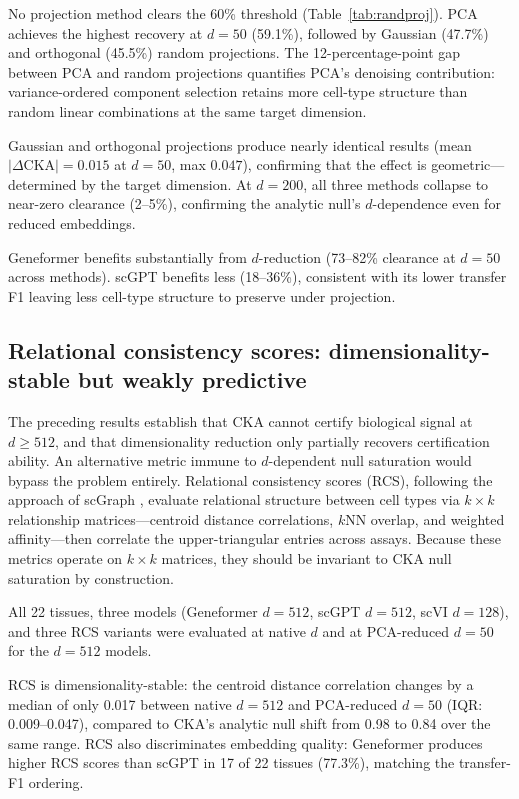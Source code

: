 \documentclass[11pt]{article}
\begin{document}
No projection method clears the 60\% threshold
(Table~\ref{tab:randproj}). PCA achieves the highest recovery at
$d = 50$ (59.1\%), followed by Gaussian (47.7\%) and orthogonal
(45.5\%) random projections. The 12-percentage-point gap between PCA
and random projections quantifies PCA's denoising contribution:
variance-ordered component selection retains more cell-type structure
than random linear combinations at the same target dimension.

Gaussian and orthogonal projections produce nearly identical results
(mean $|\Delta\text{CKA}| = 0.015$ at $d = 50$, max $0.047$),
confirming that the effect is geometric---determined by the target
dimension. At $d = 200$, all three methods collapse to near-zero
clearance (2--5\%), confirming the analytic null's $d$-dependence even for
reduced embeddings.

Geneformer benefits substantially from $d$-reduction (73--82\% clearance
at $d = 50$ across methods). scGPT benefits less (18--36\%), consistent
with its lower transfer F1 leaving less cell-type structure to preserve
under projection.


\subsection{Relational consistency scores: dimensionality-stable but weakly predictive}
\label{sec:scgraph}

The preceding results establish that CKA cannot certify biological
signal at $d \geq 512$, and that dimensionality reduction only
partially recovers certification ability. An alternative metric immune
to $d$-dependent null saturation would bypass the problem entirely.
Relational consistency scores (RCS), following the approach of scGraph
\citep{wang2026scgraph}, evaluate relational structure between cell
types via $k \times k$ relationship matrices---centroid distance
correlations, $k$NN overlap, and weighted affinity---then correlate the
upper-triangular entries across assays. Because these metrics operate on
$k \times k$ matrices, they should be invariant to CKA null saturation
by construction.

All 22 tissues, three models (Geneformer $d = 512$, scGPT $d = 512$,
scVI $d = 128$), and three RCS variants were evaluated at native $d$
and at PCA-reduced $d = 50$ for the $d = 512$ models.

RCS is dimensionality-stable: the centroid distance correlation changes
by a median of only 0.017 between native $d = 512$ and PCA-reduced
$d = 50$ (IQR: 0.009--0.047), compared to CKA's analytic null shift
from 0.98 to 0.84 over the same range. RCS also discriminates embedding
quality: Geneformer produces higher RCS scores than scGPT in 17 of
22 tissues (77.3\%), matching the transfer-F1 ordering.
\end{document}
